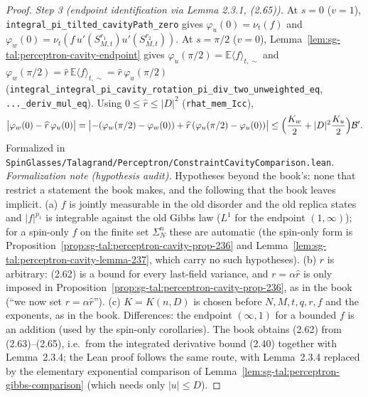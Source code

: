\begin{proof}
\emph{Step 3 (endpoint identification via Lemma 2.3.1, (2.65)).} At $s=0$ ($v=1$), \texttt{integral\_pi\_tilted\_cavityPath\_zero} gives
$\varphi_u(0)=\nu_t(f)$ and $\varphi_w(0)=\nu_t(f\,u'(S_{M,t}^{r_1})u'(S_{M,t}^{r_2}))$. At $s=\pi/2$ ($v=0$), Lemma~\ref{lem:sg-tal:perceptron-cavity-endpoint}
gives $\varphi_u(\pi/2)=\mathbb E\langle f\rangle_{t,\sim}$ and $\varphi_w(\pi/2)=\widehat r\,\mathbb E\langle f\rangle_{t,\sim}=\widehat r\,\varphi_u(\pi/2)$
(\texttt{integral\_integral\_pi\_cavity\_rotation\_pi\_div\_two\_unweighted\_eq}, \texttt{...\_deriv\_mul\_eq}). Using $0\le\widehat r\le|D|^2$
(\texttt{rhat\_mem\_Icc}),
\[
 \bigl|\varphi_w(0)-\widehat r\,\varphi_u(0)\bigr|
 =\bigl|-(\varphi_w(\pi/2)-\varphi_w(0))+\widehat r\,(\varphi_u(\pi/2)-\varphi_u(0))\bigr|
 \le\Bigl(\frac{K_w}{2}+|D|^2\frac{K_u}{2}\Bigr)\mathcal B'.
\]
Formalized in \texttt{SpinGlasses/Talagrand/Perceptron/ConstraintCavityComparison.lean}.
\emph{Formalization note (hypothesis audit).} Hypotheses beyond the book's: none that restrict a statement the book makes,
and the following that the book leaves implicit. (a) $f$ is jointly measurable in the old disorder and the old replica
states and $|f|^{p_1}$ is integrable against the old Gibbs law ($L^1$ for the endpoint $(1,\infty)$); for a spin-only $f$
on the finite set $\Sigma_N^n$ these are automatic (the spin-only form is Proposition~\ref{prop:sg-tal:perceptron-cavity-prop-236}
and Lemma~\ref{lem:sg-tal:perceptron-cavity-lemma-237}, which carry no such hypotheses). (b) $r$ is arbitrary: (2.62) is a bound for
every last-field variance, and $r=\alpha\widehat r$ is only imposed in Proposition~\ref{prop:sg-tal:perceptron-cavity-prop-236}, as in the book
(``we now set $r=\alpha\widehat r$''). (c) $K=K(n,D)$ is chosen before $N,M,t,q,r,f$ and the exponents, as in the book.
Differences: the endpoint $(\infty,1)$ for a bounded $f$ is an addition (used by the spin-only corollaries). The book obtains (2.62) from (2.63)--(2.65),
i.e.\ from the integrated derivative bound (2.40) together with Lemma~2.3.4; the Lean proof follows the same route, with Lemma~2.3.4 replaced by the
elementary exponential comparison of Lemma~\ref{lem:sg-tal:perceptron-gibbs-comparison} (which needs only $|u|\le D$).
\end{proof}

